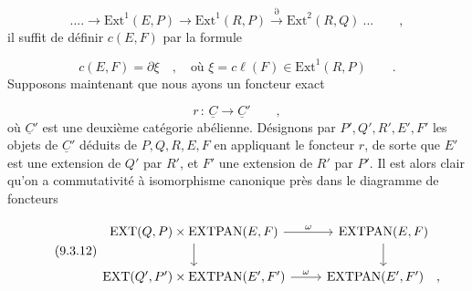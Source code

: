 \begin{equation*}
.... \longrightarrow \mathrm{Ext}^1(E,P) \longrightarrow \mathrm{Ext}^1(R,P) \stackrel{\partial}{\longrightarrow} \mathrm{Ext}^2(R,Q) \ ... \qquad ,
\end{equation*}
il suffit de définir $c(E,F)$ par la formule

\begin{equation}\tag{9.3.10}
c(E,F) = \partial \xi \quad , \quad \mbox{où } \xi = c\ell(F) \in \mathrm{Ext}^1(R,P) \qquad .
\end{equation}
Supposons maintenant que nous ayons un foncteur exact

\begin{equation}\tag{9.3.11}
r \,:\, \underline{C} \longrightarrow \underline{C}{}' \qquad ,
\end{equation}
où $\underline{C}{}'$ est une deuxième catégorie abélienne. Désignons par $P',Q',R',E',F'$ les objets de $\underline{C}{}'$ déduits de $P,Q,R,E,F$ en appliquant le foncteur $r$, de sorte que $E'$ est une extension de $Q'$ par $R'$, et $F'$ une extension de $R'$ par $P'$. Il est alors clair qu'on a commutativité à isomorphisme canonique près dans le diagramme de foncteurs

\begin{equation}\tag{9.3.12}
\begin{tikzcd}
\mathrm{EXT}(Q,P) \times \mathrm{EXTPAN}(E,F) \arrow[r, "\omega"] \arrow[d] & \mathrm{EXTPAN}(E,F) \arrow[d] \\
\mathrm{EXT}(Q',P') \times \mathrm{EXTPAN}(E',F') \arrow[r, "\omega"] & \mathrm{EXTPAN}(E',F') \quad ,
\end{tikzcd}
\end{equation}


